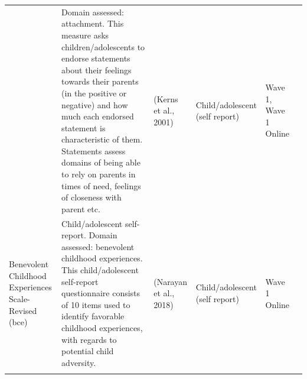 \documentclass[
]{book}
\begin{document}
\begin{longtable}[]{@{}llllll@{}}
\begin{minipage}[t]{0.18\columnwidth}
\end{minipage} & \begin{minipage}[t]{0.18\columnwidth}\raggedright
Domain assessed: attachment. This measure asks children/adolescents to endorse statements about their feelings towards their parents (in the positive or negative) and how much each endorsed statement is characteristic of them. Statements assess domains of being able to rely on parents in times of need, feelings of closeness with parent etc.\strut
\end{minipage} & \begin{minipage}[t]{0.15\columnwidth}\raggedright
(Kerns et al., 2001)\strut
\end{minipage} & \begin{minipage}[t]{0.16\columnwidth}\raggedright
Child/adolescent (self report)\strut
\end{minipage} & \begin{minipage}[t]{0.06\columnwidth}\raggedright
Wave 1, Wave 1 Online\strut
\end{minipage} & \begin{minipage}[t]{0.10\columnwidth}\raggedright
\strut
\end{minipage}\tabularnewline
\begin{minipage}[t]{0.18\columnwidth}\raggedright
Benevolent Childhood Experiences Scale- Revised (bce)\strut
\end{minipage} & \begin{minipage}[t]{0.18\columnwidth}\raggedright
Child/adolescent self-report. Domain assessed: benevolent childhood experiences. This child/adolescent self-report questionnaire consists of 10 items used to identify favorable childhood experiences, with regards to potential child adversity.\strut
\end{minipage} & \begin{minipage}[t]{0.15\columnwidth}\raggedright
(Narayan et al., 2018)\strut
\end{minipage} & \begin{minipage}[t]{0.16\columnwidth}\raggedright
Child/adolescent (self report)\strut
\end{minipage} & \begin{minipage}[t]{0.06\columnwidth}\raggedright
Wave 1 Online\strut
\end{minipage} & \begin{minipage}[t]{0.10\columnwidth}\raggedright
\strut
\end{minipage}\tabularnewline
\begin{minipage}[t]{0.18\columnwidth}\raggedright

\end{minipage}
\end{longtable}
\end{document}
